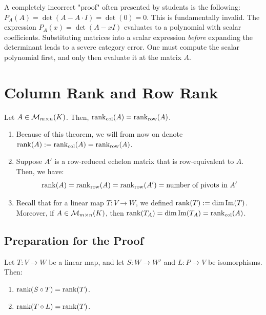 \begin{remark}\label{rem:lazy_proof}
  A completely incorrect "proof" often presented by students is the following: $P_A(A) = \det(A - A \cdot I) = \det(0) = 0$. This is fundamentally invalid. The expression $P_A(x) = \det(A - xI)$ evaluates to a polynomial with scalar coefficients. Substituting matrices into a scalar expression \textit{before} expanding the determinant leads to a severe category error. One must compute the scalar polynomial first, and only then evaluate it at the matrix $A$.
\end{remark}

\section{Column Rank and Row Rank}

\begin{theorem} \label{thm:17.c.1}
Let $A \in \mathcal{M}_{m \times n}(K)$. Then, $\operatorname{rank}_{\text{col}}(A) = \operatorname{rank}_{\text{row}}(A)$.
\end{theorem}

\begin{remark}
\begin{enumerate}
    \item Because of this theorem, we will from now on denote $\operatorname{rank}(A) := \operatorname{rank}_{\text{col}}(A) = \operatorname{rank}_{\text{row}}(A)$.
    \item Suppose $A'$ is a row-reduced echelon matrix that is row-equivalent to $A$. Then, we have:
    \begin{equation*}
        \operatorname{rank}(A) = \operatorname{rank}_{\text{row}}(A) = \operatorname{rank}_{\text{row}}(A') = \text{number of pivots in } A'
    \end{equation*}
    \item Recall that for a linear map $T: V \to W$, we defined $\operatorname{rank}(T) := \dim \operatorname{Im}(T)$. Moreover, if $A \in \mathcal{M}_{m \times n}(K)$, then $\operatorname{rank}(T_A) = \dim \operatorname{Im}(T_A) = \operatorname{rank}_{\text{col}}(A)$.
\end{enumerate}
\end{remark}

\subsection{Preparation for the Proof}

\begin{lemma} \label{lemma:17.c.2}
Let $T: V \to W$ be a linear map, and let $S: W \to W'$ and $L: P \to V$ be isomorphisms. Then:
\begin{enumerate}
    \item $\operatorname{rank}(S \circ T) = \operatorname{rank}(T)$.
    \item $\operatorname{rank}(T \circ L) = \operatorname{rank}(T)$.
\end{enumerate}
\end{lemma}

